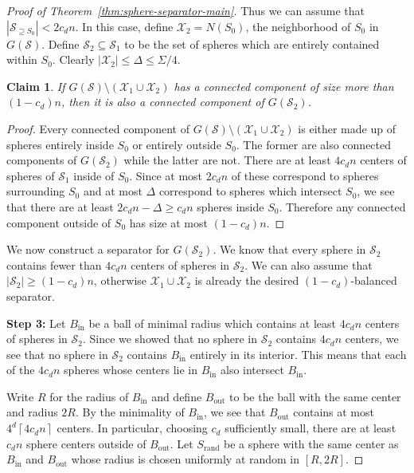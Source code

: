 \documentclass[11pt, reqno]{amsart}
\theoremstyle{plain}
\newtheorem{claim}[theorem]{Claim}
\theoremstyle{definition}
\theoremstyle{remark}
\numberwithin{theorem}{section}
\numberwithin{equation}{section}
\newcommand{\ceil}[1]{\left\lceil #1 \right\rceil}
\newcommand{\fS}{\mathcal S}
\newcommand{\fX}{\mathcal X}
\begin{document}
\begin{proof}[Proof of Theorem~\ref{thm:sphere-separator-main}]
Thus we can assume that $|\fS_{\supseteq S_0}|< 2c_dn$. In this case, define $\fX_2=N(S_0)$, the neighborhood of $S_0$ in $G(\fS)$. Define $\fS_2\subseteq\fS_1$ to be the set of spheres which are entirely contained within $S_0$. Clearly $|\fX_2|\leq \Delta\leq\Sigma/4$.

\begin{claim}
\label{claim:sphere-separator-proof}
If $G(\fS)\setminus(\fX_1\cup \fX_2)$ has a connected component of size more than $(1-c_d)n$, then it is also a connected component of $G(\fS_2)$. 
\end{claim}
\begin{proof}
Every connected component of $G(\fS)\setminus (\fX_1\cup \fX_2)$ is either made up of spheres entirely inside $S_0$ or entirely outside $S_0$. The former are also connected components of $G(\fS_2)$ while the latter are not. There are at least $4c_dn$ centers of spheres of $\fS_1$ inside of $S_0$. Since at most $2c_dn$ of these correspond to spheres surrounding $S_0$ and at most $\Delta$ correspond to spheres which intersect $S_0$, we see that there are at least $2c_dn-\Delta\geq c_dn$ spheres inside $S_0$. Therefore any connected component outside of $S_0$ has size at most $(1-c_d)n$.
\end{proof}

We now construct a separator for $G(\fS_2)$. We know that every sphere in $\fS_2$ contains fewer than $4c_dn$ centers of spheres in $\fS_2$. We can also assume that $|\fS_2|\geq(1-c_d)n$, otherwise $\fX_1\cup\fX_2$ is already the desired $(1-c_d)$-balanced separator.

\vspace{5pt} \noindent \textbf{Step 3:} Let $B_{\mathrm{in}}$ be a ball of minimal radius which contains at least $4c_dn$ centers of spheres in $\fS_2$. Since we showed that no sphere in $\fS_2$ contains $4c_dn$ centers, we see that no sphere in $\fS_2$ contains $B_{\mathrm{in}}$ entirely in its interior. This means that each of the $4c_dn$ spheres whose centers lie in $B_{\mathrm{in}}$ also intersect $B_{\mathrm{in}}$.

Write $R$ for the radius of $B_{\mathrm{in}}$ and define $B_{\mathrm{out}}$ to be the ball with the same center and radius $2R$. By the minimality of $B_{\mathrm{in}}$, we see that $B_{\mathrm{out}}$ contains at most $4^d\ceil{4c_dn}$ centers. In particular, choosing $c_d$ sufficiently small, there are at least $c_dn$ sphere centers outside of $B_{\mathrm{out}}$. Let $S_{\mathrm{rand}}$ be a sphere with the same center as $B_{\mathrm{in}}$ and $B_{\mathrm{out}}$ whose radius is chosen uniformly at random in $[R,2R]$.


\end{proof}
\end{document}
